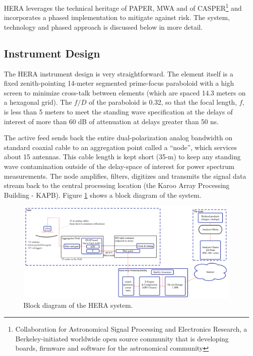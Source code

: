\documentclass[preprint]{aastex}
\begin{document}
HERA leverages the technical heritage of PAPER, MWA and of CASPER\footnote{Collaboration for Astronomical
Signal Processing and Electronics Research, a Berkeley-initiated worldwide open source community that is
developing boards, firmware and software for the astronomical community} and incorporates a
phased implementation to mitigate against risk.  The system, technology and phased approach is discussed below
in more detail.

\vspace{-0.25in}
\subsection{Instrument Design}
\vspace{-6pt}
\label{InstDes}
The HERA instrument design is very straightforward.  The element
itself is a fixed zenith-pointing 14-meter segmented prime-focus paraboloid with a high screen
to minimize cross-talk between elements (which are spaced 14.3 meters on a
hexagonal grid).   The $f/D$ of
the paraboloid is 0.32, so that the focal length, $f$, is less than 5 meters to meet the 
standing wave specification at the delays of interest of more than 60 dB of attenuation at delays 
greater than 50 ns.


The active feed sends back the entire dual-polarization analog bandwidth on standard
coaxial cable to an aggregation point called a ``node'', which services 
about 15 antennas.  This cable length is kept short (35-m) to keep any standing
wave contamination outside of the delay-space of interest for power spectrum
measurements.  The node amplifies, filters, digitizes and transmits the signal data stream
back to the central processing location (the Karoo Array Processing Building - KAPB).
Figure \ref{fig:blockDiagram} shows a block diagram of the system.

\begin{figure}[h]
\centering
\includegraphics[width=\textwidth]{plots/Engineering/HERA_high_level_block_diagram.png}
\caption{Block diagram of the HERA system.}
\label{fig:blockDiagram} 
\end{figure}
\end{document}
